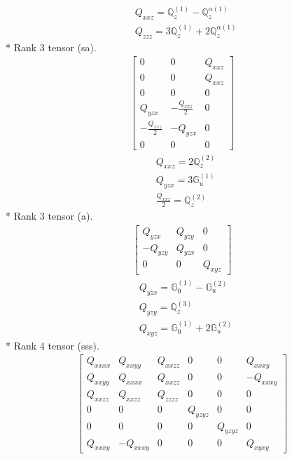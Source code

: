 \documentclass[fleqn,8pt,landscape]{jsarticle}
\begin{document}
\begin{align*}
& Q_{xxz} = \mathbb{Q}_{z}^{(1)} - \mathbb{Q}_{z}^{\alpha(1)} \\
& Q_{zzz} = 3 \mathbb{Q}_{z}^{(1)} + 2 \mathbb{Q}_{z}^{\alpha(1)}
\end{align*}
* Rank 3 tensor (sa).
\begin{align*}
\begin{bmatrix} 0 & 0 & Q_{xxz} \\ 0 & 0 & Q_{xxz} \\ 0 & 0 & 0 \\ Q_{yzx} & - \frac{Q_{xxz}}{2} & 0 \\ - \frac{Q_{xxz}}{2} & - Q_{yzx} & 0 \\ 0 & 0 & 0 \end{bmatrix}
\end{align*}
\begin{align*}
& Q_{xxz} = 2 \mathbb{Q}_{z}^{(2)} \\
& Q_{yzx} = 3 \mathbb{G}_{u}^{(1)} \\
& \frac{Q_{xxz}}{2} = \mathbb{Q}_{z}^{(2)}
\end{align*}
* Rank 3 tensor (a).
\begin{align*}
\begin{bmatrix} Q_{yzx} & Q_{yzy} & 0 \\ - Q_{yzy} & Q_{yzx} & 0 \\ 0 & 0 & Q_{xyz} \end{bmatrix}
\end{align*}
\begin{align*}
& Q_{yzx} = \mathbb{G}_{0}^{(1)} - \mathbb{G}_{u}^{(2)} \\
& Q_{yzy} = \mathbb{Q}_{z}^{(3)} \\
& Q_{xyz} = \mathbb{G}_{0}^{(1)} + 2 \mathbb{G}_{u}^{(2)}
\end{align*}
* Rank 4 tensor (sss).
\begin{align*}
\begin{bmatrix} Q_{xxxx} & Q_{xxyy} & Q_{xxzz} & 0 & 0 & Q_{xxxy} \\ Q_{xxyy} & Q_{xxxx} & Q_{xxzz} & 0 & 0 & - Q_{xxxy} \\ Q_{xxzz} & Q_{xxzz} & Q_{zzzz} & 0 & 0 & 0 \\ 0 & 0 & 0 & Q_{yzyz} & 0 & 0 \\ 0 & 0 & 0 & 0 & Q_{yzyz} & 0 \\ Q_{xxxy} & - Q_{xxxy} & 0 & 0 & 0 & Q_{xyxy} \end{bmatrix}
\end{align*}
\end{document}
